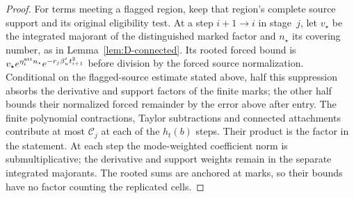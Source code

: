 \begin{proof}
For terms meeting a flagged region, keep that region's complete source support and its original eligibility test. At a step $i+1\to i$ in stage~$j$, let $v_\star$ be the integrated majorant of the distinguished marked factor and $n_\star$ its covering number, as in Lemma~\ref{lem:D-connected}. Its rooted forced bound is $v_\star e^{\eta^{\rm att}_in_\star}e^{-r_j\beta'_u t_{i+1}^2}$ before division by the forced source normalization. Conditional on the flagged-source estimate stated above, half this suppression absorbs the derivative and support factors of the finite marks; the other half bounds their normalized forced remainder by the error above after entry. The finite polynomial contractions, Taylor subtractions and connected attachments contribute at most $\mathcal C_j$ at each of the $h_t(b)$ steps. Their product is the factor in the statement. At each step the mode-weighted coefficient norm is submultiplicative; the derivative and support weights remain in the separate integrated majorants. The rooted sums are anchored at marks, so their bounds have no factor counting the replicated cells.
\end{proof}

